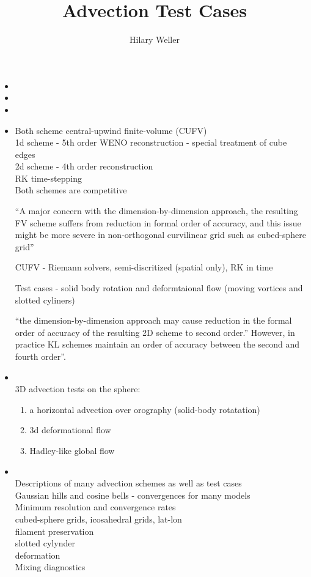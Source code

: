 \documentclass[12pt,british, round,comma,sort&compress]{article}
\begin{document}
\title{Advection Test Cases}
\author{Hilary Weller}
\maketitle

\begin{itemize}

\item {}
\item {}
\item {}

\item {}

Both scheme central-upwind finite-volume (CUFV)\\
1d scheme - 5th order WENO reconstruction - special treatment of cube edges\\
2d scheme - 4th order reconstruction\\
RK time-stepping\\
Both schemes are competitive

``A major concern with the dimension-by-dimension approach, the resulting FV scheme suffers from reduction in formal order of accuracy, and this issue might be more severe in non-orthogonal curvilinear grid such as cubed-sphere grid''

CUFV - Riemann solvers, semi-discritized (spatial only), RK in time

Test cases - solid body rotation and deformtaional flow (moving vortices and slotted cyliners)

``the dimension-by-dimension approach may cause reduction in the formal order of accuracy of the resulting 2D scheme to second order.'' However, in practice KL schemes maintain an order of accuracy between the second and fourth order''.

\item {}\ \\
3D advection tests on the sphere:
\begin{enumerate}
    \item a horizontal advection over orography (solid-body rotatation)
    \item 3d deformational flow
    \item Hadley-like global flow
\end{enumerate}

\item {}\ \\
Descriptions of many advection schemes as well as test cases\\
Gaussian hills and cosine bells - convergences for many models\\
Minimum resolution and convergence rates\\
cubed-sphere grids, icosahedral grids, lat-lon\\
filament preservation\\
slotted cylynder\\
deformation\\
Mixing diagnostics


\end{itemize}
\end{document}
